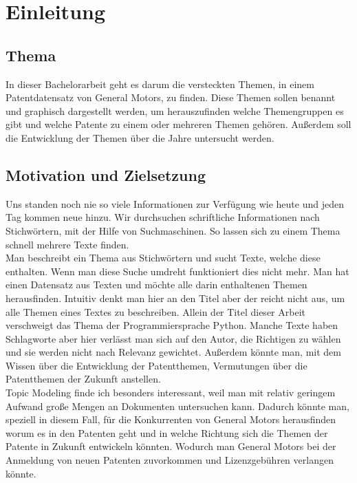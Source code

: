 \lstset{language=C}

%
%

\chapter{Einleitung}
\section{Thema}
In dieser Bachelorarbeit geht es darum die versteckten Themen, in einem Patentdatensatz von General Motors, zu finden. Diese Themen sollen benannt und graphisch dargestellt werden, um herauszufinden welche Themengruppen es gibt und welche Patente zu einem oder mehreren Themen gehören. Außerdem soll die Entwicklung der Themen über die Jahre untersucht werden.

\section{Motivation und Zielsetzung}
Uns standen noch nie so viele Informationen zur Verfügung wie heute und jeden Tag kommen neue hinzu. Wir durchsuchen schriftliche Informationen nach Stichwörtern, mit der Hilfe von Suchmaschinen. So lassen sich zu einem Thema schnell mehrere Texte finden.\\

Man beschreibt ein Thema aus Stichwörtern und sucht Texte, welche diese enthalten. Wenn man diese Suche umdreht funktioniert dies nicht mehr. Man hat einen Datensatz aus Texten und möchte alle darin enthaltenen Themen herausfinden. Intuitiv denkt man hier an den Titel aber der reicht nicht aus, um alle Themen eines Textes zu beschreiben. Allein der Titel dieser Arbeit verschweigt das Thema der Programmiersprache Python. Manche Texte haben Schlagworte aber hier verlässt man sich auf den Autor, die Richtigen zu wählen und sie werden nicht nach Relevanz gewichtet. Außerdem könnte man, mit dem Wissen über die Entwicklung der Patentthemen, Vermutungen über die Patentthemen der Zukunft anstellen.\\

Topic Modeling finde ich besonders interessant, weil man mit relativ geringem Aufwand große Mengen an Dokumenten untersuchen kann. Dadurch könnte man, speziell in diesem Fall, für die Konkurrenten von General Motors herausfinden worum es in den Patenten geht und in welche Richtung sich die Themen der Patente in Zukunft entwickeln könnten. Wodurch man General Motors bei der Anmeldung von neuen Patenten zuvorkommen und Lizenzgebühren verlangen könnte.\\

